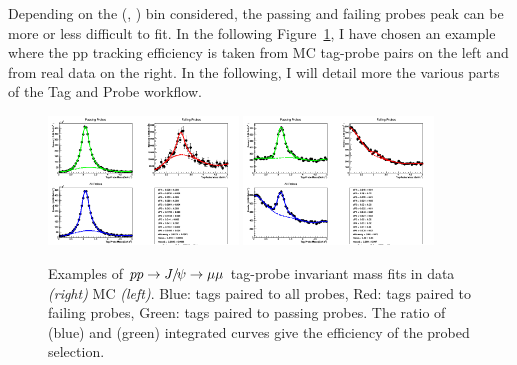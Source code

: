 Depending on the (\pt, \Pgh) bin considered, the passing and failing
probes peak can be more or less difficult to fit. In the following
Figure~\ref{fig:pp_tnp_fits_example}, I have chosen an example where
the pp tracking efficiency is taken from MC tag-probe pairs on the
left and from real data on the right. In the following, I will detail more the various parts of
the Tag and Probe workflow.

\begin{figure}
  \begin{center}
    \includegraphics[width=0.45\textwidth]{Chapters/aCorrection/mass_MC_trk.png}
    \includegraphics[width=0.45\textwidth]{Chapters/aCorrection/mass_RD_trk.png}\\
    \caption{Examples of $pp \to J\hspace{-.08em}/\hspace{-.14em}\psi \to \mu\mu$ tag-probe invariant mass fits in data \emph{(right)}
     MC \emph{(left)}. Blue: tags paired to all probes, Red: tags
     paired to failing probes, Green: tags paired to passing
     probes. The ratio of (blue) and (green) integrated curves give
     the efficiency of the probed selection.
   }
    \label{fig:pp_tnp_fits_example}
  \end{center}
\end{figure}


